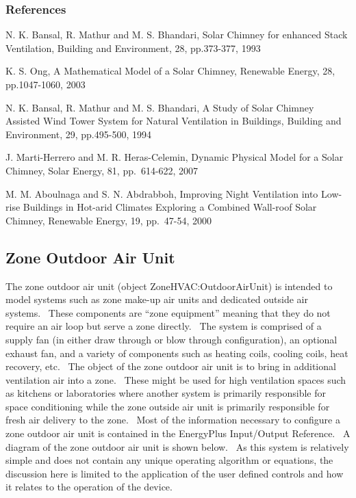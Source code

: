 \subsubsection{References}\label{references-7}

N. K. Bansal, R. Mathur and M. S. Bhandari, Solar Chimney for enhanced Stack Ventilation, Building and Environment, 28, pp.373-377, 1993

K. S. Ong, A Mathematical Model of a Solar Chimney, Renewable Energy, 28, pp.1047-1060, 2003

N. K. Bansal, R. Mathur and M. S. Bhandari, A Study of Solar Chimney Assisted Wind Tower System for Natural Ventilation in Buildings, Building and Environment, 29, pp.495-500, 1994

J. Marti-Herrero and M. R. Heras-Celemin, Dynamic Physical Model for a Solar Chimney, Solar Energy, 81, pp.~614-622, 2007

M. M. Aboulnaga and S. N. Abdrabboh, Improving Night Ventilation into Low-rise Buildings in Hot-arid Climates Exploring a Combined Wall-roof Solar Chimney, Renewable Energy, 19, pp.~47-54, 2000

\subsection{Zone Outdoor Air Unit}\label{zone-outdoor-air-unit}

The zone outdoor air unit (object ZoneHVAC:OutdoorAirUnit) is intended to model systems such as zone make-up air units and dedicated outside air systems.~ These components are ``zone equipment'' meaning that they do not require an air loop but serve a zone directly.~ The system is comprised of a supply fan (in either draw through or blow through configuration), an optional exhaust fan, and a variety of components such as heating coils, cooling coils, heat recovery, etc.~ The object of the zone outdoor air unit is to bring in additional ventilation air into a zone.~ These might be used for high ventilation spaces such as kitchens or laboratories where another system is primarily responsible for space conditioning while the zone outside air unit is primarily responsible for fresh air delivery to the zone.~ Most of the information necessary to configure a zone outdoor air unit is contained in the EnergyPlus Input/Output Reference.~ A diagram of the zone outdoor air unit is shown below.~ As this system is relatively simple and does not contain any unique operating algorithm or equations, the discussion here is limited to the application of the user defined controls and how it relates to the operation of the device.

